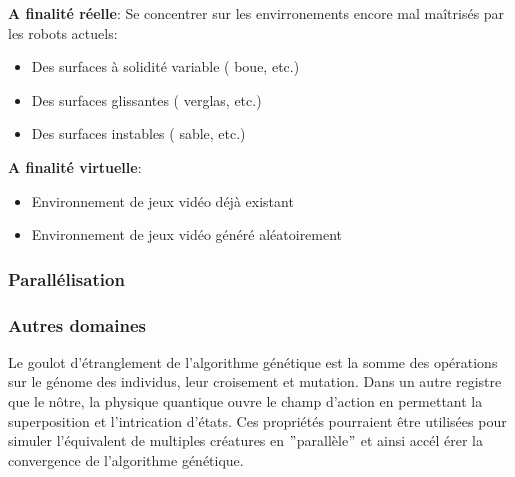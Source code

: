 \documentclass[journal, a4paper]{IEEEtran}
\begin{document}
	\textbf{A finalité réelle}:
	Se concentrer sur les envirronements encore mal maîtrisés par les
	robots actuels:
	\begin{itemize}
			\item Des surfaces à solidité variable ( boue, etc.)
			\item Des surfaces glissantes ( verglas, etc.)
			\item Des surfaces instables ( sable, etc.)
		\end{itemize}
	\textbf{A finalité virtuelle}:
	\begin{itemize}
			\item Environnement de jeux vidéo déjà existant
			\item Environnement de jeux vidéo généré aléatoirement
			\end{itemize}

\subsubsection{Parallélisation}

\subsubsection{Autres domaines}
	Le goulot d'étranglement de l'algorithme génétique est la somme
	des opérations sur le génome des individus, leur croisement et
	mutation.
	Dans un autre registre que le nôtre, la physique quantique ouvre le
	champ d'action en permettant la superposition et
	l'intrication
	d'états.
	Ces propriétés pourraient être utilisées pour simuler
	l'équivalent de multiples créatures en \("\)parallèle\("\) et ainsi accél
	érer la convergence
	de l'algorithme génétique.\cite{quantum-computing}
\end{document}
